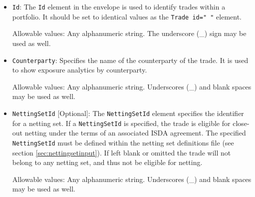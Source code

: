 \begin{itemize}
\item {\tt Id}: The {\tt Id} element in the envelope is used to identify trades within a portfolio. It should be set to
  identical values as the {\tt Trade id=" "} element.

  Allowable values: Any alphanumeric string. The underscore (\_) sign may be used as well.

%

\item {\tt Counterparty}: Specifies the name of the counterparty of the trade.  It is used to show exposure analytics by
  counterparty.

Allowable values: Any alphanumeric string. Underscores (\_) and blank spaces may be used as well. 



\item {\tt NettingSetId} [Optional]: The {\tt NettingSetId} element specifies the identifier for a netting set. If a
  \lstinline!NettingSetId! is specified, the trade is eligible for close-out netting under the terms of an associated
  ISDA agreement. The specified {\tt NettingSetId} must be defined within the netting set definitions file
  (see section \ref{sec:nettingsetinput}). If left blank or omitted the trade will not belong to any netting set, and thus not be
  eligible for netting.

Allowable values: Any alphanumeric string. Underscores (\_) and blank spaces may be used as well. 



\end{itemize}
